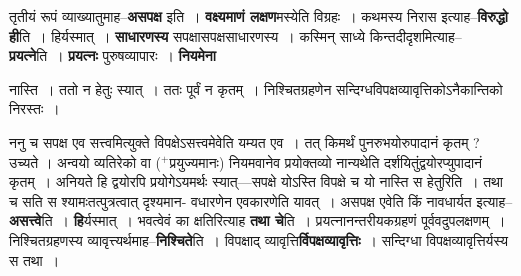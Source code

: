 \documentclass[article,12pt,a4paper]{memoir}
\newcommand{\add}[1]{($^{+}$#1)}
\begin{document}
	  \pstart तृतीयं रूपं व्याख्यातुमाह--\textbf{असपक्ष} इति । \textbf{वक्ष्यमाणं लक्षण}मस्येति विग्रहः । कथमस्य निरास इत्याह--\textbf{विरुद्धो ही}ति । हिर्यस्मात् । \textbf{साधारणस्य} सपक्षासपक्षसाधारणस्य । कस्मिन् साध्ये किन्तदीदृशमित्याह--\textbf{प्रयत्ने}ति । \textbf{प्रयत्नः} पुरुषव्यापारः । \textbf{नियमेना}  \leavevmode{} 
	  
	नास्ति । ततो न हेतुः स्यात् । ततः पूर्वं न कृतम् । निश्चितग्रहणेन सन्दिग्धविपक्षव्यावृत्तिकोऽनैकान्तिको निरस्तः ।  
	  
	ननु च सपक्ष एव सत्त्वमित्युक्ते विपक्षेऽसत्त्वमेवेति यम्यत एव । तत् किमर्थं पुनरुभयोरुपादानं कृतम् ? उच्यते । अन्वयो व्यतिरेको वा \add{प्रयुज्यमानः} नियमवानेव प्रयोक्तव्यो नान्यथेति दर्शयितुंद्वयोरप्युपादानं कृतम् । अनियते हि द्वयोरपि प्रयोगेऽयमर्थः स्यात्—सपक्षे योऽस्ति विपक्षे च यो नास्ति स हेतुरिति । तथा च सति स श्यामःतत्पुत्रत्वात् दृश्यमान- वधारणेन एवकारणेति यावत् । असपक्ष एवेति किं नावधार्यत इत्याह--\textbf{असत्त्वे}ति । \textbf{हि}र्यस्मात् । भवत्वेवं का क्षतिरित्याह \textbf{तथा चे}ति । प्रयत्नानन्तरीयकग्रहणं पूर्ववदुपलक्षणम् । निश्चितग्रहणस्य व्यावृत्त्यर्थमाह--\textbf{निश्चिते}ति । विपक्षाद् व्यावृत्ति\textbf{र्विपक्षव्यावृत्तिः} । सन्दिग्धा विपक्षव्यावृत्तिर्यस्य स तथा ।
	\pend
      
\end{document}
